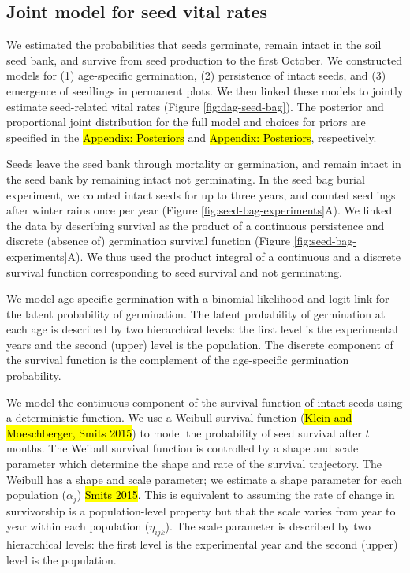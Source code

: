 \documentclass[12pt, oneside, titlepage]{article}   	%
\begin{document}
\subsection{Joint model for seed vital rates}

We estimated the probabilities that seeds germinate, remain intact in the soil seed bank, and survive from seed production to the first October. We constructed models for (1) age-specific germination, (2) persistence of intact seeds, and (3) emergence of seedlings in permanent plots. We then linked these models to jointly estimate seed-related vital rates (Figure \ref{fig:dag-seed-bag}). The posterior and proportional joint distribution for the full model and choices for priors are specified in the \hl{Appendix: Posteriors} and \hl{Appendix: Posteriors}, respectively.

Seeds leave the seed bank through mortality or germination, and remain intact in the seed bank by remaining intact not germinating. In the seed bag burial experiment, we counted intact seeds for up to three years, and counted seedlings after winter rains once per year (Figure \ref{fig:seed-bag-experiments}A). We linked the data by describing survival as the product of a continuous persistence and discrete (absence of) germination survival function (Figure \ref{fig:seed-bag-experiments}A). We thus used the product integral of a continuous and a discrete survival function corresponding to seed survival and not germinating. 

We model age-specific germination with a binomial likelihood and logit-link for the latent probability of germination. The latent probability of germination at each age is described by two hierarchical levels: the first level is the experimental years and the second (upper) level is the population. The discrete component of the survival function is the complement of the age-specific germination probability. 

We model the continuous component of the survival function of intact seeds using a deterministic function. We use a Weibull survival function (\hl{Klein and Moeschberger, Smits 2015}) to model the probability of seed survival after $t$ months. The Weibull survival function is controlled by a shape and scale parameter which determine the shape and rate of the survival trajectory. The Weibull has a shape and scale parameter; we estimate a shape parameter for each population ($\alpha_j$) \hl{Smits 2015}. This is equivalent to assuming the rate of change in survivorship is a population-level property but that the scale varies from year to year within each population ($\eta_{ijk}$). The scale parameter is described by two hierarchical levels: the first level is the experimental year and the second (upper) level is the population.
\end{document}
